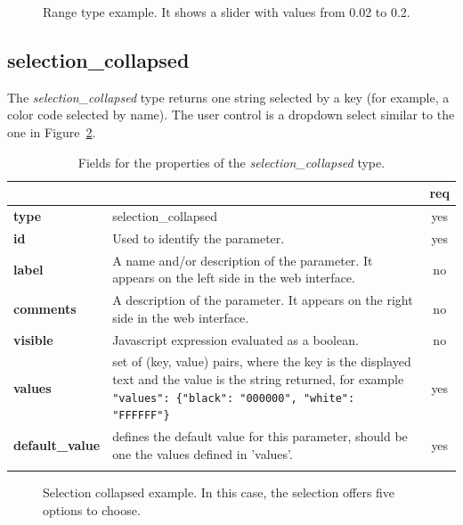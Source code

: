 \begin{figure}[h]
\centering
{}
\caption{Range type example. It shows a slider with values from 0.02 to 0.2.}
\label{fig:sliders}
\end{figure}

\subsection{selection\_collapsed}

The \emph{selection\_collapsed} type returns one string selected by a key (for example, a color code selected by name). The user control is a dropdown select similar to the one in Figure~\ref{fig:selection_collapsed_example}.

\begin{longtable}{|>{\bf}L{\linewidth}|L{\linewidth}|c|}
\hline
      &  & {\bf req} 
\tabularnewline \hline \hline
 type  & selection\_collapsed    & yes \\ \hline
 id     & Used to identify the parameter. & yes \\ \hline
 label  & A name and/or description of the parameter. It appears on the left side in the web interface. & no
                      \\ \hline
 comments & A description of the parameter. It appears on the right side in the web interface. & no
                      \\ \hline
 visible    & Javascript expression evaluated as a boolean.
            & no \\ \hline
 values & set of (key, value) pairs, where the key is the displayed text and the 
value is the string returned, for example \texttt{"values": \{"black": "000000", "white": "FFFFFF"\}} & yes
                      \\ \hline
 default\_value & defines the default value for this parameter, should be one 
the values defined in 'values'. & yes \\ \hline
\caption{Fields for the properties of the \emph{selection\_collapsed} type.}
\end{longtable}

\begin{figure}[h]
\centering
{}
\caption{Selection collapsed example. In this case, the selection offers five options to choose.}
\label{fig:selection_collapsed_example}
\end{figure}

